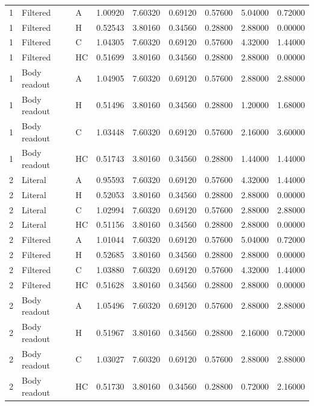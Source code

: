\begin{longtable}{lllllllll}
1 & Filtered & A & 1.00920 & 7.60320 & 0.69120 & 0.57600 & 5.04000 & 0.72000 \\
1 & Filtered & H & 0.52543 & 3.80160 & 0.34560 & 0.28800 & 2.88000 & 0.00000 \\
1 & Filtered & C & 1.04305 & 7.60320 & 0.69120 & 0.57600 & 4.32000 & 1.44000 \\
1 & Filtered & HC & 0.51699 & 3.80160 & 0.34560 & 0.28800 & 2.88000 & 0.00000 \\
1 & Body readout & A & 1.04905 & 7.60320 & 0.69120 & 0.57600 & 2.88000 & 2.88000 \\
1 & Body readout & H & 0.51496 & 3.80160 & 0.34560 & 0.28800 & 1.20000 & 1.68000 \\
1 & Body readout & C & 1.03448 & 7.60320 & 0.69120 & 0.57600 & 2.16000 & 3.60000 \\
1 & Body readout & HC & 0.51743 & 3.80160 & 0.34560 & 0.28800 & 1.44000 & 1.44000 \\
2 & Literal & A & 0.95593 & 7.60320 & 0.69120 & 0.57600 & 4.32000 & 1.44000 \\
2 & Literal & H & 0.52053 & 3.80160 & 0.34560 & 0.28800 & 2.88000 & 0.00000 \\
2 & Literal & C & 1.02994 & 7.60320 & 0.69120 & 0.57600 & 2.88000 & 2.88000 \\
2 & Literal & HC & 0.51156 & 3.80160 & 0.34560 & 0.28800 & 2.88000 & 0.00000 \\
2 & Filtered & A & 1.01044 & 7.60320 & 0.69120 & 0.57600 & 5.04000 & 0.72000 \\
2 & Filtered & H & 0.52685 & 3.80160 & 0.34560 & 0.28800 & 2.88000 & 0.00000 \\
2 & Filtered & C & 1.03880 & 7.60320 & 0.69120 & 0.57600 & 4.32000 & 1.44000 \\
2 & Filtered & HC & 0.51628 & 3.80160 & 0.34560 & 0.28800 & 2.88000 & 0.00000 \\
2 & Body readout & A & 1.05496 & 7.60320 & 0.69120 & 0.57600 & 2.88000 & 2.88000 \\
2 & Body readout & H & 0.51967 & 3.80160 & 0.34560 & 0.28800 & 2.16000 & 0.72000 \\
2 & Body readout & C & 1.03027 & 7.60320 & 0.69120 & 0.57600 & 2.88000 & 2.88000 \\
2 & Body readout & HC & 0.51730 & 3.80160 & 0.34560 & 0.28800 & 0.72000 & 2.16000 \\
\bottomrule
\end{longtable}
